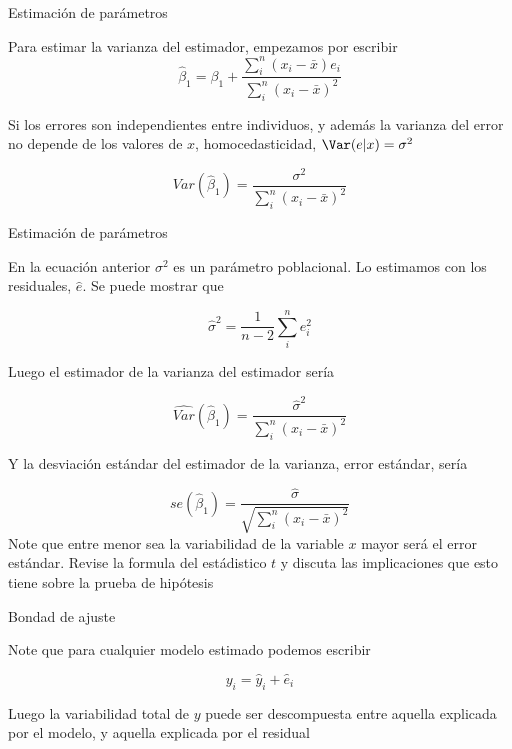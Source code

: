 \documentclass{beamer}
\begin{document}
\begin{frame}{Estimación de parámetros}

Para estimar la varianza del estimador, empezamos por escribir
\begin{equation*}
    \hat{\beta}_1=\beta_1+\dfrac{\sum_i^n(x_i-\bar{x})e_i}{\sum_i^n(x_i-\bar{x})^2}
\end{equation*}

Si los errores son independientes entre individuos, y además la varianza del error no depende de los valores de $x$, homocedasticidad, $\Var(e|x)=\sigma^2$

\begin{equation*}
    Var(\hat{\beta}_1)=\dfrac{\sigma^2}{\sum_i^n(x_i-\bar{x})^2}
\end{equation*}

\end{frame}

    \begin{frame}{Estimación de parámetros}

    En la ecuación anterior $\sigma^2$ es un parámetro poblacional. Lo estimamos con los residuales, $\hat{e}$. Se puede mostrar que

    \begin{equation*}
        \hat{\sigma}^2=\dfrac{1}{n-2}\sum_i^ne_i^2
    \end{equation*}

    Luego el estimador de la varianza del estimador sería

   \begin{equation*}
    \hat{Var}(\hat{\beta}_1)=\dfrac{\hat{\sigma}^2}{\sum_i^n(x_i-\bar{x})^2}
\end{equation*} 

\end{frame}

\begin{frame}
Y la desviación estándar del estimador de la varianza, error estándar, sería

\begin{equation*}
    se(\hat{\beta}_1)=\dfrac{\hat{\sigma}}{\sqrt{\sum_i^n(x_i-\bar{x})^2}}
\end{equation*}
        Note que entre menor sea la variabilidad de la variable $x$ mayor será el error estándar. Revise la formula del estádistico $t$ y discuta las implicaciones que esto tiene sobre la prueba de hipótesis
    \end{frame}

    \begin{frame}{Bondad de ajuste}

    Note que para cualquier modelo estimado podemos escribir

    \begin{equation*}
        y_i=\hat{y}_i+\hat{e}_i
    \end{equation*}

    Luego la variabilidad total de $y$ puede ser descompuesta entre aquella explicada por el modelo, y aquella explicada por el residual
            
    \end{frame}
\end{document}
